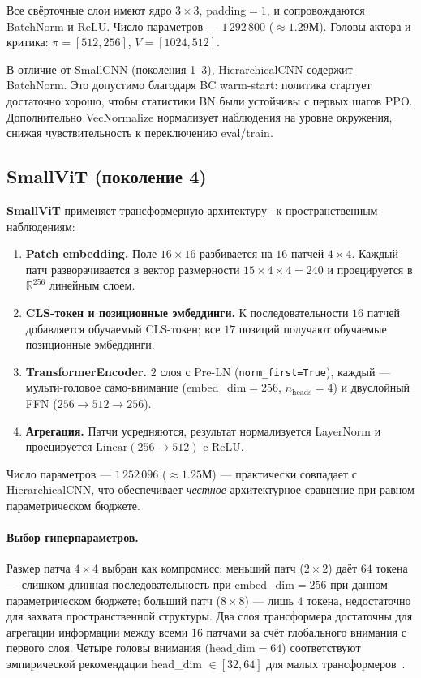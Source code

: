 \documentclass[12pt, a4paper]{article}
\begin{document}
Все свёрточные слои имеют ядро $3\times3$, padding$=1$, и сопровождаются BatchNorm и ReLU. Число параметров --- $1\,292\,800$ (${\approx}1.29$М). Головы актора и критика: $\pi=[512,256]$, $V=[1024,512]$.

В отличие от SmallCNN (поколения 1--3), HierarchicalCNN содержит BatchNorm. Это допустимо благодаря BC warm-start: политика стартует достаточно хорошо, чтобы статистики BN были устойчивы с первых шагов PPO. Дополнительно VecNormalize нормализует наблюдения на уровне окружения, снижая чувствительность к переключению eval/train.

\subsection{SmallViT (поколение 4)}

\textbf{SmallViT} применяет трансформерную архитектуру~\cite{dosovitskiy2020} к пространственным наблюдениям:

\begin{enumerate}
  \item \textbf{Patch embedding.} Поле $16\times16$ разбивается на $16$ патчей $4\times4$. Каждый патч разворачивается в вектор размерности $15\times4\times4=240$ и проецируется в $\mathbb{R}^{256}$ линейным слоем.
  \item \textbf{CLS-токен и позиционные эмбеддинги.} К последовательности $16$ патчей добавляется обучаемый CLS-токен; все $17$ позиций получают обучаемые позиционные эмбеддинги.
  \item \textbf{TransformerEncoder.} $2$ слоя с Pre-LN (\texttt{norm\_first=True}), каждый --- мульти-головое само-внимание (embed\_dim$=256$, $n_\text{heads}=4$) и двуслойный FFN ($256\to512\to256$).
  \item \textbf{Агрегация.} Патчи усредняются, результат нормализуется LayerNorm и проецируется $\mathrm{Linear}(256\to512)$ c ReLU.
\end{enumerate}

Число параметров --- $1\,252\,096$ (${\approx}1.25$М) --- практически совпадает с HierarchicalCNN, что обеспечивает \textit{честное} архитектурное сравнение при равном параметрическом бюджете.

\paragraph{Выбор гиперпараметров.}
Размер патча $4\times4$ выбран как компромисс: меньший патч ($2\times2$) даёт $64$ токена --- слишком длинная последовательность при embed\_dim$=256$ при данном параметрическом бюджете; больший патч ($8\times8$) --- лишь $4$ токена, недостаточно для захвата пространственной структуры. Два слоя трансформера достаточны для агрегации информации между всеми $16$ патчами за счёт глобального внимания с первого слоя. Четыре головы внимания ($\text{head\_dim}=64$) соответствуют эмпирической рекомендации head\_dim $\in [32, 64]$ для малых трансформеров~\cite{dosovitskiy2020}.
\end{document}
